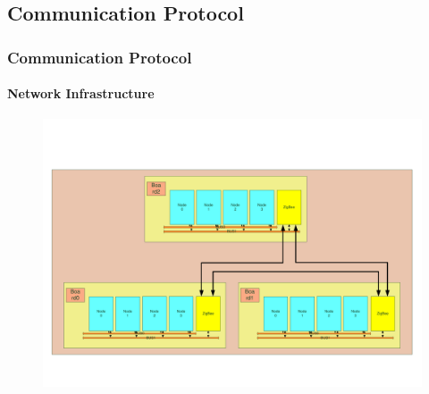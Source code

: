 \documentclass{beamer}
\theoremstyle{definition} \newtheorem{mdefinition}{Definition}
\theoremstyle{plain} \newtheorem{mtheorem}{Theorem}
\theoremstyle{plain} \newtheorem{mcorollary}{Corollary}
\theoremstyle{plain} \newtheorem{mfact}{Fact}
\begin{document}
\subsection{Communication Protocol}
\begin{frame}
  \frametitle{Communication Protocol}
  \framesubtitle{Network Infrastructure}
  \begin{figure}
    \includegraphics[width=\textwidth]{img/zigbee.pdf}
  \end{figure}
\end{frame}
\end{document}
